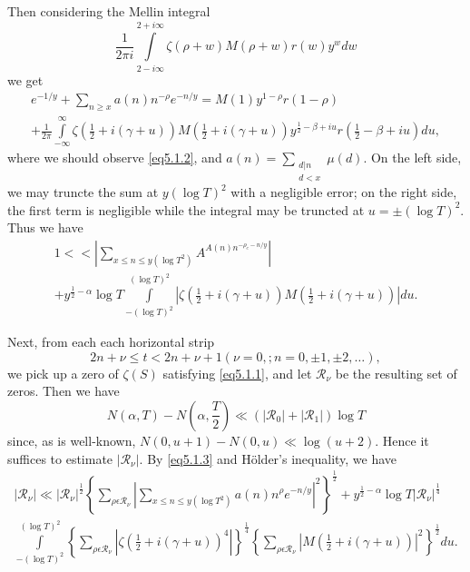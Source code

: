 Then considering the Mellin integral 
$$
\frac{1}{2 \pi i} \int\limits^{2 + i \infty}_{2- i \infty} \zeta(\rho
+w) M(\rho + w) r (w) y^w dw 
$$
we get 
\begin{multline*}
  e^{-1/y} + \sum_{n \geq x}a (n) n^{-\rho} e^{-n/y}
  = M(1)y^{1- \rho } r (1 -\rho) \\
  + \frac{1}{2 \pi} \int\limits^{\infty}_{-\infty} \zeta
  \left(\frac{1}{2}+ i (\gamma + u)\right) M\left(\frac{1}{2} + i
  (\gamma + u)\right) y^{\frac{1}{2} - \beta + iu}
  r\left(\frac{1}{2}- \beta + iu \right) du,
\end{multline*}
where we should observe \eqref{eq5.1.2}, and $a(n) = \sum \limits_{\substack{
    d | n \\ {d < x}}} \mu (d)$.  On the left side, we may truncte the
sum at $y(\log T)^2$ with a negligible error; on the right side, the
first term is negligible while the  integral may be truncted at $u =
\pm (\log T)^2$. Thus we have   
\begin{multline*}
  1<< | \sum_{ x \leq n \leq y (\log T^2)} A^{ A (n) n^{-\rho_e - n/y}}|\\
  + y^{\frac{1}{2} -\alpha} \log T \int\limits^{(\log T)^2}_{-(\log
    T)^2}| \zeta \left(\frac{1}{2}+ i(\gamma + u)\right)
  M\left(\frac{1}{2} + i(\gamma + u)\right) |
  du. \tag{5.1.3} \label{eq5.1.3} 
\end{multline*}\pageoriginale
 
Next, from each each horizontal strip 
$$
2n + \nu \leq t < 2n + \nu +1(\nu = 0, ; n = 0, \pm 1, \pm 2, \ldots), 
$$
we pick up a zero of $\zeta (S)$ satisfying \eqref{eq5.1.1}, and let
$\mathscr{R}_{\nu}$ be the resulting set of zeros. Then we have  
\begin{equation*}
  N(\alpha, T) -N \left(\alpha,  \frac{T}{2}\right) \ll ( | \mathscr{R}_0 |  +
  |\mathscr{R}_1 | ) \log T \tag{5.1.4} \label{eq5.1.4}
\end{equation*}
since, as is well-known, $N(0, u + 1) - N(0, u) \ll \log (u + 2)$. Hence
it suffices to estimate $ | \mathscr{R}_{\nu} |$. By \eqref{eq5.1.3}
and H\"older's inequality, we have  
\begin{multline*}
  | \mathscr{R}_{\nu} | \ll | \mathscr{R}_{\nu} |^{\frac{1}{2}} \left\{
  \sum_{\rho \epsilon  \mathscr{R}_{\nu}}| \sum_{x \leq n \leq y
    (\log T^2)}a (n) n^{\rho} e^{-n/y}|^2 \right\}^{\frac{1}{2}}
  + y^{\frac{1}{2} -\alpha} \log T | \mathscr{R}_{\nu} |^{\frac{1}{4}}\\
  \int \limits^{(\log T)^2}_{-(\log T)^2} \left\{ \sum_{\rho \epsilon
    \mathscr{R}_\nu} |\zeta \left(\frac{1}{2} + i
  (\gamma +u)\right)^4 | \right\}^{\frac{1}{4}} \left\{ \sum_{\rho \epsilon 
    \mathscr{R}_{\nu}} | M \left(\frac{1}{2}+i(\gamma + u)\right)|^2
  \right\}^{\frac{1}{2}}du. \tag{5.1.5} \label{eq5.1.5} 
\end{multline*}


